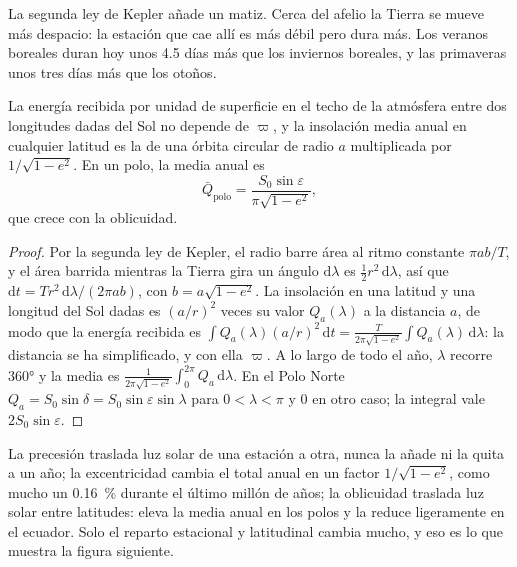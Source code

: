 La segunda ley de Kepler añade un matiz. Cerca del afelio la Tierra se mueve más despacio: la estación que cae
allí es más débil pero dura más. Los veranos boreales duran hoy unos 4.5 días más que los inviernos
boreales, y las primaveras unos tres días más que los otoños.

\begin{proposition}\label{prop:b2:orbital-forcing:annual}
La energía recibida por unidad de superficie en el techo de la atmósfera entre dos longitudes dadas
del Sol no depende de $\varpi$, y la insolación media anual en cualquier latitud es la de una
órbita circular de radio $a$ multiplicada por $1/\sqrt{1 - e^2}$. En un polo, la media anual es
\[
  \bar Q_{\text{polo}} = \frac{S_0\sin\varepsilon}{\pi\sqrt{1 - e^2}} ,
\]
que crece con la oblicuidad.
\end{proposition}

\begin{proof}
Por la segunda ley de Kepler, el radio barre área al ritmo constante $\pi ab/T$, y el área barrida
mientras la Tierra gira un ángulo $\mathrm d\lambda$ es $\frac12 r^2\,\mathrm d\lambda$, así que $\mathrm dt =
T r^2\,\mathrm d\lambda/(2\pi ab)$, con $b = a\sqrt{1 - e^2}$. La insolación en una latitud y una
longitud del Sol dadas es $(a/r)^2$ veces su valor $Q_a(\lambda)$ a la distancia $a$, de modo que la
energía recibida es $\int Q_a(\lambda)(a/r)^2\,\mathrm dt = \frac{T}{2\pi\sqrt{1 - e^2}}\int
Q_a(\lambda)\,\mathrm d\lambda$: la distancia se ha simplificado, y con ella $\varpi$. A lo largo de todo el
año, $\lambda$ recorre \ang{360} y la media es $\frac{1}{2\pi\sqrt{1-e^2}}\int_0^{2\pi}
Q_a\,\mathrm d\lambda$. En el Polo Norte $Q_a = S_0\sin\delta = S_0\sin\varepsilon\sin\lambda$
para $0 < \lambda < \pi$ y 0 en otro caso; la integral vale $2S_0\sin\varepsilon$.
\end{proof}

La precesión traslada luz solar de una estación a otra, nunca la añade ni la quita a un año; la excentricidad
cambia el total anual en un factor $1/\sqrt{1 - e^2}$, como mucho un \qty{0.16}{\percent} durante el
último millón de años; la oblicuidad traslada luz solar entre latitudes: eleva la media anual en los
polos y la reduce ligeramente en el ecuador. Solo el reparto estacional y latitudinal cambia
mucho, y eso es lo que muestra la figura siguiente.

